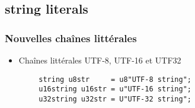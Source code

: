 \documentclass[C++.tex]{subfiles}
\begin{document}
\subsection*{string literals}
\begin{frame}[fragile]
	\frametitle{Nouvelles chaînes littérales}
	\begin{itemize}
		\item Chaînes littérales UTF-8, UTF-16 et UTF32
	\end{itemize}

	\begin{verbatim}
		string u8str     = u8"UTF-8 string";
		u16string u16str = u"UTF-16 string";
		u32string u32str = U"UTF-32 string";
	\end{verbatim}

\end{frame}
\end{document}

